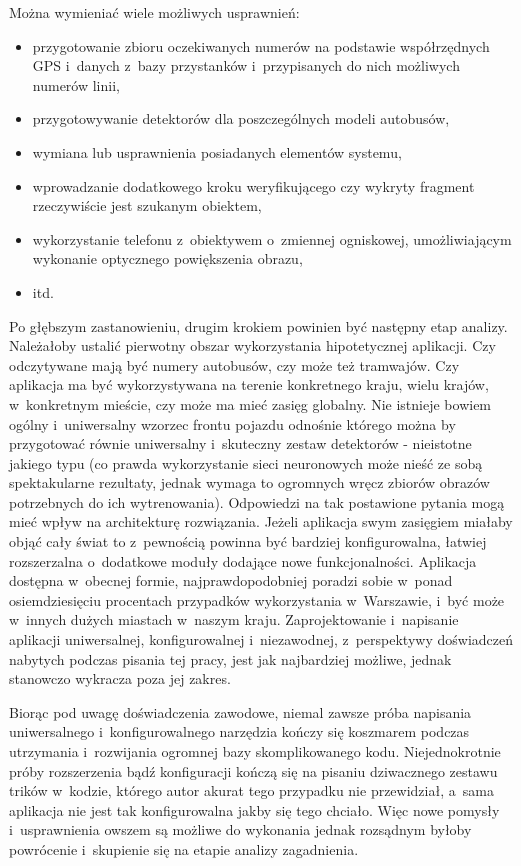 Można wymieniać wiele możliwych usprawnień:
\begin{itemize}
	\item przygotowanie zbioru oczekiwanych numerów na podstawie współrzędnych
	GPS i~danych z~bazy przystanków i~przypisanych do nich możliwych numerów linii,
	\item przygotowywanie detektorów dla poszczególnych modeli autobusów,
	\item wymiana lub usprawnienia posiadanych elementów systemu,
	\item wprowadzanie dodatkowego kroku weryfikującego czy wykryty 
	fragment rzeczywiście jest szukanym obiektem,
	\item wykorzystanie telefonu z~obiektywem o~zmiennej ogniskowej,
	umożliwiającym wykonanie optycznego powiększenia obrazu,
	\item itd.
\end{itemize}

Po głębszym zastanowieniu, drugim krokiem powinien być następny
etap analizy. Należałoby ustalić pierwotny obszar wykorzystania 
hipotetycznej aplikacji. Czy odczytywane mają być numery autobusów,
czy może też tramwajów. Czy aplikacja ma być wykorzystywana na terenie
konkretnego kraju, wielu krajów, w~konkretnym mieście, czy może ma mieć zasięg
globalny. Nie istnieje bowiem ogólny i~uniwersalny wzorzec frontu pojazdu
odnośnie którego można by przygotować równie uniwersalny i~skuteczny
zestaw detektorów - nieistotne jakiego typu (co prawda wykorzystanie
sieci neuronowych może nieść ze sobą spektakularne rezultaty, jednak
wymaga to ogromnych wręcz zbiorów obrazów potrzebnych do ich wytrenowania).
Odpowiedzi na tak postawione pytania mogą mieć wpływ
na architekturę rozwiązania. Jeżeli aplikacja swym zasięgiem 
miałaby objąć cały świat to z~pewnością powinna być bardziej konfigurowalna, 
łatwiej rozszerzalna o~dodatkowe moduły dodające nowe funkcjonalności.
Aplikacja dostępna w~obecnej formie, najprawdopodobniej poradzi sobie
w~ponad osiemdziesięciu procentach przypadków wykorzystania w~Warszawie, i~być
może w~innych dużych miastach w~naszym kraju. Zaprojektowanie i~napisanie
aplikacji uniwersalnej, konfigurowalnej i~niezawodnej, z~perspektywy
doświadczeń nabytych podczas pisania tej pracy, jest jak najbardziej
możliwe, jednak stanowczo wykracza poza jej zakres.

Biorąc pod uwagę doświadczenia zawodowe, niemal zawsze próba napisania
uniwersalnego i~konfigurowalnego narzędzia kończy się koszmarem podczas utrzymania i~rozwijania 
ogromnej bazy skomplikowanego kodu. Niejednokrotnie próby rozszerzenia bądź konfiguracji
kończą się na pisaniu dziwacznego zestawu trików w~kodzie, którego autor akurat tego przypadku
nie przewidział, a~sama aplikacja nie jest tak konfigurowalna jakby się tego chciało.
Więc nowe pomysły i~usprawnienia owszem są możliwe do wykonania jednak rozsądnym byłoby
powrócenie i~skupienie się na etapie analizy zagadnienia.

